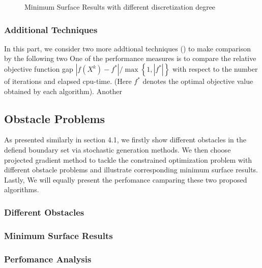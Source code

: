 \begin{figure}[!htbp]
{    }
    \caption{Minimum Surface Results with different discretization degree}
    \label{fig:min_surf_discretization}  
\end{figure}
\subsubsection{Additional Techniques}
In this part, we consider two more addtional techniques () to make comparison by the following two One of the performance measures is to compare the relative objective function gap $\left|f\left(X^{k}\right)-f^{*}\right| / \max \left\{1,\left|f^{*}\right|\right\}$ with respect to the number of iterations and elapsed cpu-time. (Here $f^{*}$ denotes the optimal objective value obtained by each algorithm). Another
\subsection{Obstacle Problems}
As presented similarly in section 4.1, we firstly show different obstacles in the defiend boundary set via stochastic generation methods. We then choose projected gradient method to tackle the constrained optimization problem with different obstacle problems and illustrate corresponding minimum surface results. Lastly, We will equally present the perfomance camparing these two proposed algorithms. 
\subsubsection{Different Obstacles}
\subsubsection{Minimum Surface Results}
\subsubsection{Perfomance Analysis}



